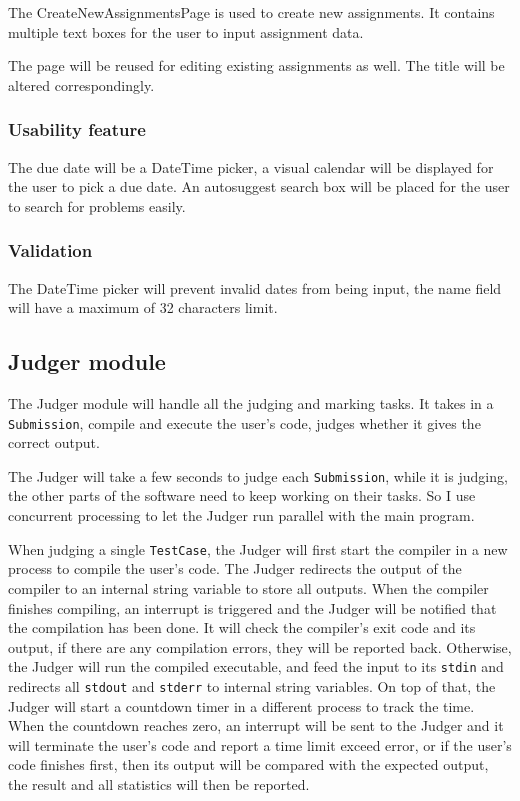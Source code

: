 \documentclass[a4paper]{report}
\newcommand{\code}{\texttt}
\begin{document}
The CreateNewAssignmentsPage is used to create new assignments. It contains multiple text boxes for the user to input assignment data.

The page will be reused for editing existing assignments as well. The title will be altered correspondingly.

\subsubsection{Usability feature}

The due date will be a DateTime picker, a visual calendar will be displayed for the user to pick a due date. An autosuggest search box will be placed for the user to search for problems easily.

\subsubsection{Validation}

The DateTime picker will prevent invalid dates from being input, the name field will have a maximum of 32 characters limit.

\subsection{Judger module}

The Judger module will handle all the judging and marking tasks. It takes in a \code{Submission}, compile and execute the user's code, judges whether it gives the correct output.

The Judger will take a few seconds to judge each \code{Submission}, while it is judging, the other parts of the software need to keep working on their tasks. So I use concurrent processing to let the Judger run parallel with the main program.

When judging a single \code{TestCase}, the Judger will first start the compiler in a new process to compile the user's code. The Judger redirects the output of the compiler to an internal string variable to store all outputs. When the compiler finishes compiling, an interrupt is triggered and the Judger will be notified that the compilation has been done. It will check the compiler's exit code and its output, if there are any compilation errors, they will be reported back. Otherwise, the Judger will run the compiled executable, and feed the input to its \code{stdin} and redirects all \code{stdout} and \code{stderr} to internal string variables. On top of that, the Judger will start a countdown timer in a different process to track the time. When the countdown reaches zero, an interrupt will be sent to the Judger and it will terminate the user's code and report a time limit exceed error, or if the user's code finishes first, then its output will be compared with the expected output, the result and all statistics will then be reported.
\end{document}
